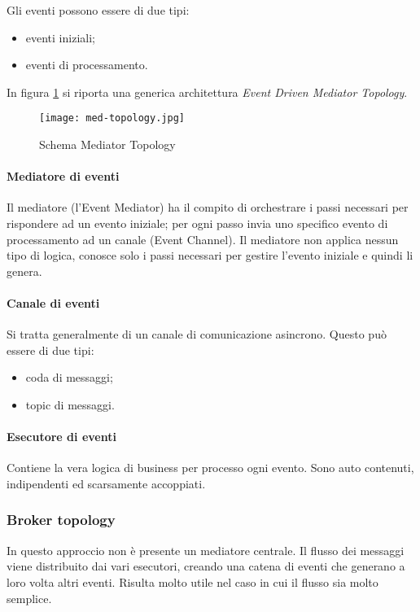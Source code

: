 Gli eventi possono essere di due tipi:
\begin{itemize}
    \item eventi iniziali;
    \item eventi di processamento.
\end{itemize}
    
In figura \ref{fig:eventdriver-med-top} si riporta una generica architettura \emph{Event Driven Mediator Topology}.   
\begin{figure}[htbp]
    \centering
    \texttt{[image: med-topology.jpg]} 
    \caption{Schema Mediator Topology}
    \label{fig:eventdriver-med-top} 
\end{figure}

\paragraph{Mediatore di eventi}
Il mediatore (l’Event Mediator) ha il compito di orchestrare i passi necessari per rispondere ad un evento iniziale; per ogni passo invia uno specifico evento di processamento ad un canale (Event Channel). Il mediatore non applica nessun tipo di logica, conosce solo i passi necessari per gestire l’evento iniziale e quindi li genera.
\paragraph{Canale di eventi}
Si tratta generalmente di un canale di comunicazione asincrono. Questo può essere di due tipi:
\begin{itemize}
    \item coda di messaggi;
    \item topic di messaggi.
\end{itemize}
\paragraph{Esecutore di eventi}
Contiene la vera logica di business per processo ogni evento. Sono auto contenuti, indipendenti ed scarsamente accoppiati.



\subsubsection{Broker topology}
In questo approccio non è presente un mediatore centrale. Il flusso dei messaggi viene distribuito dai vari esecutori, creando una catena di eventi che generano a loro volta altri eventi. Risulta molto utile nel caso in cui il flusso sia molto semplice. 

